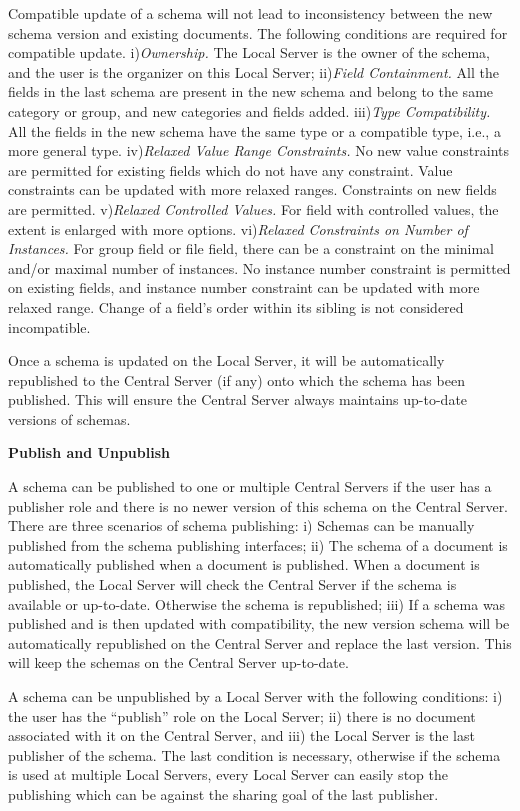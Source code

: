 \documentclass{doublecol-new}
\theoremstyle{TH}{
\newtheorem{lemma}{Lemma}
\newtheorem{theorem}[lemma]{Theorem}
\newtheorem{corrolary}[lemma]{Corrolary}
\newtheorem{conjecture}[lemma]{Conjecture}
\newtheorem{proposition}[lemma]{Proposition}
\newtheorem{claim}[lemma]{Claim}
\newtheorem{stheorem}[lemma]{Wrong Theorem}
\newtheorem{algorithm}{Algorithm}
}
\theoremstyle{THrm}{
\newtheorem{definition}{Definition}[section]
\newtheorem{question}{Question}[section]
\newtheorem{remark}{Remark}
\newtheorem{scheme}{Scheme}
}
\theoremstyle{THhit}{
\newtheorem{case}{Case}[section]
}
\begin{document}
Compatible update of a schema will not lead to inconsistency between
the new schema version and existing documents. The following
conditions are required for compatible update.   i){\em Ownership.}
The Local Server is the owner of the schema, and the user is the
organizer on this Local Server; ii){\em Field Containment.}  All the
fields in the last schema are present in the  new schema and belong
to the same category or group, and new categories and fields added.
iii){\em Type Compatibility.} All the fields in the new schema have
the same type   or a compatible type, i.e., a more general type.
iv){\em Relaxed Value Range Constraints.} No new value constraints
are permitted  for  existing fields which do not have any
constraint. Value constraints can be updated with more relaxed
ranges. Constraints on new fields are permitted. v){\em Relaxed
Controlled Values.} For field with controlled values, the extent is
enlarged with more options. vi){\em Relaxed Constraints on Number of
Instances.} For group field or file field, there can be a constraint
on the minimal and/or maximal number of instances.  No instance
number constraint is permitted on existing fields, and instance
number constraint can be updated with more relaxed range. Change of
a field's order within its sibling is not considered incompatible.


Once a schema is updated on the Local Server, it will be automatically
republished to the Central Server (if any) onto which the schema has been
published. This will ensure the Central Server always maintains up-to-date
versions of schemas.

\textbf{Publish and Unpublish}

A schema can be published to one or multiple Central Servers if the
user has a publisher role and there is no newer version of this
schema on the Central Server.  There are three scenarios of schema
publishing: i) Schemas can be manually  published from the schema
publishing interfaces; ii) The schema of a document is automatically
published when a document is published. When a document is
published, the Local Server will check the Central Server if the
schema is available or up-to-date. Otherwise the schema is
republished; iii) If a schema was published and is then updated with
compatibility, the new version schema will be automatically
republished on the Central  Server and replace the last version.
This will keep the schemas on the  Central Server up-to-date.


A schema can be unpublished by a Local Server with the following conditions:
i) the user has the ``publish'' role on the Local Server; ii) there is no
document associated with it on the Central Server, and iii) the Local Server
is the last publisher of the schema. The last condition is necessary,
otherwise if the schema is used at multiple Local Servers, every Local Server
can easily stop the publishing which can be against the sharing goal of the
last publisher.
\end{document}
